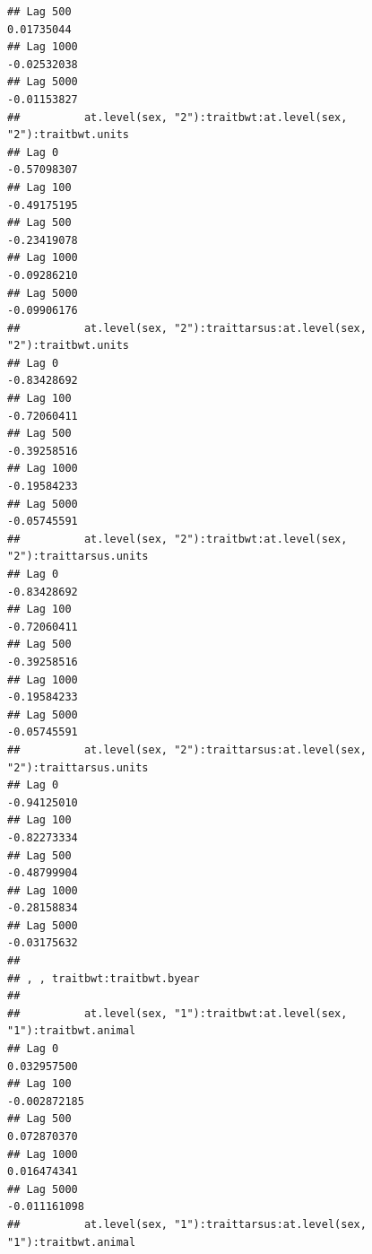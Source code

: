 \documentclass[
  12pt,
]{book}
\begin{document}
\begin{verbatim}
## Lag 500                                                           0.01735044
## Lag 1000                                                         -0.02532038
## Lag 5000                                                         -0.01153827
##          at.level(sex, "2"):traitbwt:at.level(sex, "2"):traitbwt.units
## Lag 0                                                      -0.57098307
## Lag 100                                                    -0.49175195
## Lag 500                                                    -0.23419078
## Lag 1000                                                   -0.09286210
## Lag 5000                                                   -0.09906176
##          at.level(sex, "2"):traittarsus:at.level(sex, "2"):traitbwt.units
## Lag 0                                                         -0.83428692
## Lag 100                                                       -0.72060411
## Lag 500                                                       -0.39258516
## Lag 1000                                                      -0.19584233
## Lag 5000                                                      -0.05745591
##          at.level(sex, "2"):traitbwt:at.level(sex, "2"):traittarsus.units
## Lag 0                                                         -0.83428692
## Lag 100                                                       -0.72060411
## Lag 500                                                       -0.39258516
## Lag 1000                                                      -0.19584233
## Lag 5000                                                      -0.05745591
##          at.level(sex, "2"):traittarsus:at.level(sex, "2"):traittarsus.units
## Lag 0                                                            -0.94125010
## Lag 100                                                          -0.82273334
## Lag 500                                                          -0.48799904
## Lag 1000                                                         -0.28158834
## Lag 5000                                                         -0.03175632
## 
## , , traitbwt:traitbwt.byear
## 
##          at.level(sex, "1"):traitbwt:at.level(sex, "1"):traitbwt.animal
## Lag 0                                                       0.032957500
## Lag 100                                                    -0.002872185
## Lag 500                                                     0.072870370
## Lag 1000                                                    0.016474341
## Lag 5000                                                   -0.011161098
##          at.level(sex, "1"):traittarsus:at.level(sex, "1"):traitbwt.animal

\end{verbatim}
\end{document}
